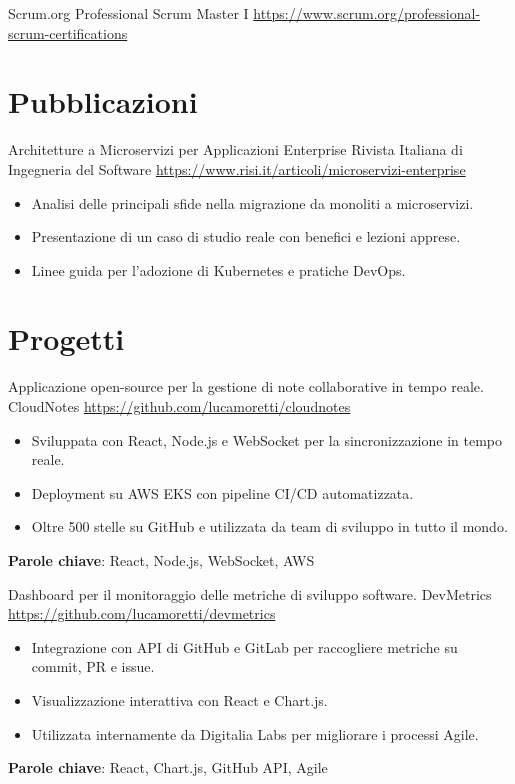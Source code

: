 \documentclass[a4paper, serif, 10pt]{moderncv}
\begin{document}
        {Scrum.org}
        {Professional Scrum Master I}
        {\url{https://www.scrum.org/professional-scrum-certifications}}
        {}
        {}
\section{Pubblicazioni}

        {Architetture a Microservizi per Applicazioni Enterprise}
        {Rivista Italiana di Ingegneria del Software}
        {\url{https://www.risi.it/articoli/microservizi-enterprise}}
        {}
        {\begin{itemize}
\item Analisi delle principali sfide nella migrazione da monoliti a microservizi.
\item Presentazione di un caso di studio reale con benefici e lezioni apprese.
\item Linee guida per l'adozione di Kubernetes e pratiche DevOps.
\end{itemize}}
\section{Progetti}

        {Applicazione open-source per la gestione di note collaborative in tempo reale.}
        {CloudNotes}
        {\url{https://github.com/lucamoretti/cloudnotes}}
        {}
        {\begin{itemize}
\item Sviluppata con React, Node.js e WebSocket per la sincronizzazione in tempo reale.
\item Deployment su AWS EKS con pipeline CI/CD automatizzata.
\item Oltre 500 stelle su GitHub e utilizzata da team di sviluppo in tutto il mondo.
\end{itemize}
\textbf{Parole chiave}: React, Node.js, WebSocket, AWS}

        {Dashboard per il monitoraggio delle metriche di sviluppo software.}
        {DevMetrics}
        {\url{https://github.com/lucamoretti/devmetrics}}
        {}
        {\begin{itemize}
\item Integrazione con API di GitHub e GitLab per raccogliere metriche su commit, PR e issue.
\item Visualizzazione interattiva con React e Chart.js.
\item Utilizzata internamente da Digitalia Labs per migliorare i processi Agile.
\end{itemize}
\textbf{Parole chiave}: React, Chart.js, GitHub API, Agile}
\end{document}
